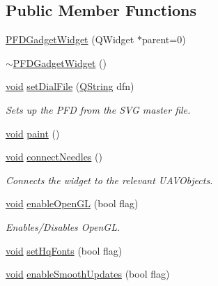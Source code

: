 \subsection*{Public Member Functions}
\begin{DoxyCompactItemize}
\item 
\hyperlink{group___o_p_map_plugin_ga17d40a36b34086eea9ceb1007e56ae57}{P\-F\-D\-Gadget\-Widget} (Q\-Widget $\ast$parent=0)
\item 
\hyperlink{group___o_p_map_plugin_ga6e0515cffb2a380be1ecec650da18f4d}{$\sim$\-P\-F\-D\-Gadget\-Widget} ()
\item 
\hyperlink{group___u_a_v_objects_plugin_ga444cf2ff3f0ecbe028adce838d373f5c}{void} \hyperlink{group___o_p_map_plugin_ga2de7c848eacd359fc56a4c2a8c2b6aaf}{set\-Dial\-File} (\hyperlink{group___u_a_v_objects_plugin_gab9d252f49c333c94a72f97ce3105a32d}{Q\-String} dfn)
\begin{DoxyCompactList}\small\item\em Sets up the P\-F\-D from the S\-V\-G master file. \end{DoxyCompactList}\item 
\hyperlink{group___u_a_v_objects_plugin_ga444cf2ff3f0ecbe028adce838d373f5c}{void} \hyperlink{group___o_p_map_plugin_ga62f5dc20f4d0cbc357f70b0661484695}{paint} ()
\item 
\hyperlink{group___u_a_v_objects_plugin_ga444cf2ff3f0ecbe028adce838d373f5c}{void} \hyperlink{group___o_p_map_plugin_ga0fa94b6084a622184f38a1ef0d259792}{connect\-Needles} ()
\begin{DoxyCompactList}\small\item\em Connects the widget to the relevant U\-A\-V\-Objects. \end{DoxyCompactList}\item 
\hyperlink{group___u_a_v_objects_plugin_ga444cf2ff3f0ecbe028adce838d373f5c}{void} \hyperlink{group___o_p_map_plugin_gadbda4e66095d596d888dbbb05e4edbcd}{enable\-Open\-G\-L} (bool flag)
\begin{DoxyCompactList}\small\item\em Enables/\-Disables Open\-G\-L. \end{DoxyCompactList}\item 
\hyperlink{group___u_a_v_objects_plugin_ga444cf2ff3f0ecbe028adce838d373f5c}{void} \hyperlink{group___o_p_map_plugin_gab8b36af02b4938286d29131fbc633744}{set\-Hq\-Fonts} (bool flag)
\item 
\hyperlink{group___u_a_v_objects_plugin_ga444cf2ff3f0ecbe028adce838d373f5c}{void} \hyperlink{group___o_p_map_plugin_ga2c92de52a19bc7483773b7cb14c118f6}{enable\-Smooth\-Updates} (bool flag)
\end{DoxyCompactItemize}
